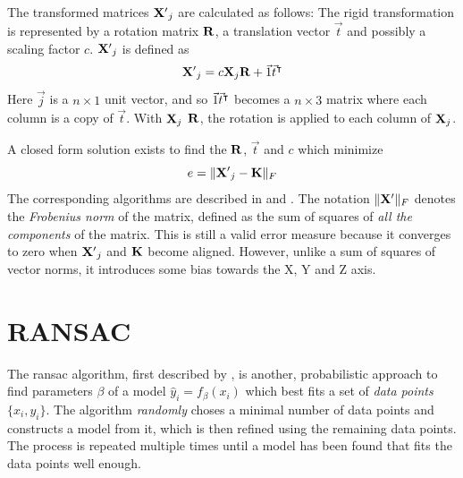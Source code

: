 The transformed matrices $\mathbf{X'}_j$ are calculated as follows: The rigid transformation is represented by a rotation matrix $\mathbf{R}$, a translation vector $\vec{t}$ and possibly a scaling factor $c$. $\mathbf{X'}_j$ is defined as
\begin{equation}
\mathbf{X'}_j = c \mathbf{X}_j \mathbf{R} + \vec{1} \vec{t}^\intercal
\end{equation}
Here $\vec{j}$ is a $n \times 1$ unit vector, and so $\vec{1} \vec{t}^\intercal$ becomes a $n \times 3$ matrix where each column is a copy of $\vec{t}$. With $\mathbf{X}_j$ $\mathbf{R}$, the rotation is applied to each column of $\mathbf{X}_j$.

A closed form solution exists to find the $\mathbf{R}$, $\vec{t}$ and $c$ which minimize
\begin{equation}
e = \| \mathbf{X'}_j - \mathbf{K} \|_{F}
\end{equation} 
The corresponding algorithms are described in \cite{Scho1970} and \cite{Scho1966}. The notation $\| \mathbf{X'} \|_{F}$ denotes the \emph{Frobenius norm} of the matrix, defined as the sum of squares of \emph{all the components} of the matrix. This is still a valid error measure because it converges to zero when $\mathbf{X'}_j$ and $\mathbf{K}$ become aligned. However, unlike a sum of squares of vector norms, it introduces some bias towards the X, Y and Z axis.


\section{RANSAC}
The \gls{ransac} algorithm, first described by \cite{Fisc1980}, is another, probabilistic approach to find parameters $\beta$ of a model $\hat{y}_i = f_\beta(x_i)$ which best fits a set of \emph{data points} $\{ x_i, y_i \}$. The algorithm \emph{randomly} choses a minimal number of data points and constructs a model from it, which is then refined using the remaining data points. The process is repeated multiple times until a model has been found that fits the data points well enough.

